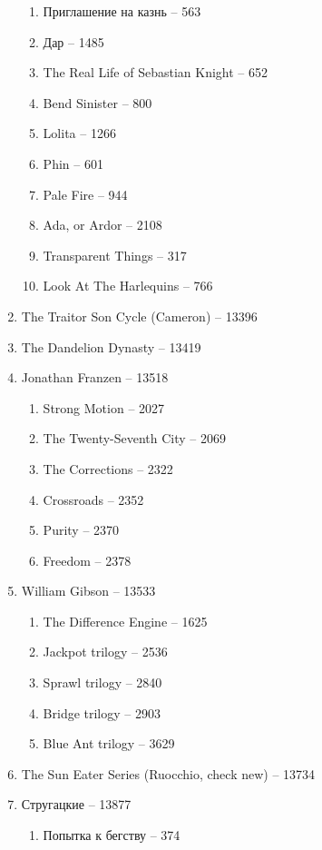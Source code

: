 \documentclass[a4paper, 11pt]{proc} %
\begin{document}
\begin{enumerate}
\begin{enumerate}
            \item Приглашение на казнь -- 563
            \item Дар -- 1485
            \item The Real Life of Sebastian Knight -- 652
            \item Bend Sinister -- 800
            \item Lolita -- 1266
            \item Phin -- 601
            \item Pale Fire -- 944
            \item Ada, or Ardor -- 2108
            \item Transparent Things -- 317
            \item Look At The Harlequins -- 766
        \end{enumerate}
    \item The Traitor Son Cycle (Cameron) -- 13396
    \item The Dandelion Dynasty -- 13419
    \item Jonathan Franzen -- 13518
        \begin{enumerate}
            \item Strong Motion -- 2027
            \item The Twenty-Seventh City -- 2069
            \item The Corrections -- 2322
            \item Crossroads -- 2352
            \item Purity -- 2370
            \item Freedom -- 2378
        \end{enumerate}
    \item William Gibson -- 13533
        \begin{enumerate}
            \item The Difference Engine -- 1625
            \item Jackpot trilogy -- 2536
            \item Sprawl trilogy -- 2840
            \item Bridge trilogy -- 2903
            \item Blue Ant trilogy -- 3629
        \end{enumerate}
    \item The Sun Eater Series (Ruocchio, check new) -- 13734
    \item Стругацкие -- 13877
        \begin{enumerate}
            \item Попытка к бегству -- 374

\end{enumerate}
\end{enumerate}
\end{document}
